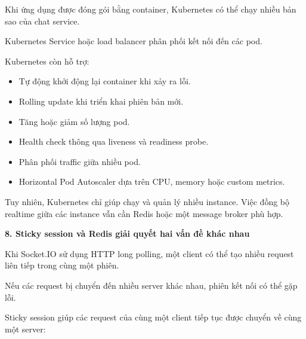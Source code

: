 Khi ứng dụng được đóng gói bằng container, Kubernetes có thể chạy nhiều
bản sao của chat service.

\begin{Shaded}
\begin{Highlighting}[]
\end{Highlighting}
\end{Shaded}

Kubernetes Service hoặc load balancer phân phối kết nối đến các pod.

Kubernetes còn hỗ trợ:

\begin{itemize}
\tightlist
\item
  Tự động khởi động lại container khi xảy ra lỗi.
\item
  Rolling update khi triển khai phiên bản mới.
\item
  Tăng hoặc giảm số lượng pod.
\item
  Health check thông qua liveness và readiness probe.
\item
  Phân phối traffic giữa nhiều pod.
\item
  Horizontal Pod Autoscaler dựa trên CPU, memory hoặc custom metrics.
\end{itemize}

Tuy nhiên, Kubernetes chỉ giúp chạy và quản lý nhiều instance. Việc đồng
bộ realtime giữa các instance vẫn cần Redis hoặc một message broker phù
hợp.

\vspace{0.5em}\noindent\textbf{8. Sticky session và Redis giải quyết hai vấn đề khác
nhau}\par

Khi Socket.IO sử dụng HTTP long polling, một client có thể tạo nhiều
request liên tiếp trong cùng một phiên.

Nếu các request bị chuyển đến nhiều server khác nhau, phiên kết nối có
thể gặp lỗi.

Sticky session giúp các request của cùng một client tiếp tục được chuyển
về cùng một server:

\begin{Shaded}
\begin{Highlighting}[]
\end{Highlighting}
\end{Shaded}

